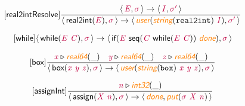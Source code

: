 \documentclass[10pt,leqno,fleqn]{article}
\newcommand{\artVariable}[1]{\mbox{\color{purple}\em #1\/}}
\newcommand{\artConstructor}[1]{\mbox{\sf #1}}
\newcommand{\artCaseInsensitiveLiteral}[1]{\mbox{\tt #1}}
\newcommand{\artSpecial}[1]{\mbox{\color{orange}\sf\em #1}}
\begin{document}
\begin{equation}
\tag*{[\artConstructor{\sf real2intResolve}]}
\begin{split}\frac{\langle\, \artVariable{E}, \artVariable{$\sigma$}\,\rangle \rightarrow \langle\, \artVariable{I}, \artVariable{$\sigma$\/$^\prime$}\,\rangle }{\langle\, \artConstructor{\sf real2int}(\artVariable{E}), \artVariable{$\sigma$}\,\rangle \rightarrow \langle\, \artSpecial{user}(\artSpecial{string}(\artCaseInsensitiveLiteral{real2int})\ \artVariable{I}), \artVariable{$\sigma$\/$^\prime$}\,\rangle }
\end{split}
\end{equation}

\begin{equation}
\tag*{[\artConstructor{\sf while}]}
\begin{split}\langle\, \artConstructor{\sf while}(\artVariable{E}\ \artVariable{C}), \artVariable{$\sigma$}\,\rangle \rightarrow \langle\, \artConstructor{\sf if}(\artVariable{E}\ \artConstructor{\sf seq}(\artVariable{C}\ \artConstructor{\sf while}(\artVariable{E}\ \artVariable{C}))\ \artSpecial{done}), \artVariable{$\sigma$}\,\rangle 
\end{split}
\end{equation}

\begin{equation}
\tag*{[\artConstructor{\sf box}]}
\begin{split}\frac{ \artVariable{x}\triangleright \artSpecial{real64}(\_) \quad  \artVariable{y}\triangleright \artSpecial{real64}(\_) \quad  \artVariable{z}\triangleright \artSpecial{real64}(\_) }{\langle\, \artConstructor{\sf box}(\artVariable{x}\ \artVariable{y}\ \artVariable{z}), \artVariable{$\sigma$}\,\rangle \rightarrow \langle\, \artSpecial{user}(\artSpecial{string}(\artCaseInsensitiveLiteral{box})\ \artVariable{x}\ \artVariable{y}\ \artVariable{z}), \artVariable{$\sigma$}\,\rangle }
\end{split}
\end{equation}

\begin{equation}
\tag*{[\artConstructor{\sf assignInt}]}
\begin{split}\frac{ \artVariable{n}\triangleright \artSpecial{int32}(\_) }{\langle\, \artConstructor{\sf assign}(\artVariable{X}\ \artVariable{n}), \artVariable{$\sigma$}\,\rangle \rightarrow \langle\, \artSpecial{done}, \artSpecial{put}(\artVariable{$\sigma$}\ \artVariable{X}\ \artVariable{n})\,\rangle }
\end{split}
\end{equation}
\end{document}
